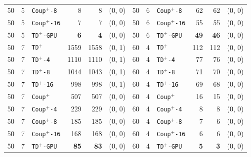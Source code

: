 \documentclass[letterpaper]{article}
\begin{document}
\begin{table}[t]
{\begin{tabular}{rrlrrl|rrlrrl}
50 & 5 & \texttt{Coup}$^+$\texttt{-8} & 8 & 8 & (0, 0) & 50 & 6 & \texttt{Coup}$^+$\texttt{-8} & 62 & 62 & (0, 0) \\
50 & 5 & \texttt{Coup}$^+$\texttt{-16} & 7 & 7 & (0, 0) & 50 & 6 & \texttt{Coup}$^+$\texttt{-16} & 55 & 55 & (0, 0) \\
50 & 5 & \texttt{TD}$^+$\texttt{-GPU} & \textbf{6} & \textbf{4} & (0, 0) & 50 & 6 & \texttt{TD}$^+$\texttt{-GPU} & \textbf{49} & \textbf{46} & (0, 0) \\
\midrule
50 & 7 & \texttt{TD}$^+$ & 1559 & 1558 & (0, 1) & 60 & 4 & \texttt{TD}$^+$ & 112 & 112 & (0, 0) \\
50 & 7 & \texttt{TD}$^+$\texttt{-4} & 1110 & 1110 & (0, 1) & 60 & 4 & \texttt{TD}$^+$\texttt{-4} & 77 & 76 & (0, 0) \\
50 & 7 & \texttt{TD}$^+$\texttt{-8} & 1044 & 1043 & (0, 1) & 60 & 4 & \texttt{TD}$^+$\texttt{-8} & 71 & 70 & (0, 0) \\
50 & 7 & \texttt{TD}$^+$\texttt{-16} & 998 & 998 & (0, 1) & 60 & 4 & \texttt{TD}$^+$\texttt{-16} & 69 & 68 & (0, 0) \\
50 & 7 & \texttt{Coup}$^+$ & 507 & 507 & (0, 0) & 60 & 4 & \texttt{Coup}$^+$ & 16 & 15 & (0, 0) \\
50 & 7 & \texttt{Coup}$^+$\texttt{-4} & 229 & 229 & (0, 0) & 60 & 4 & \texttt{Coup}$^+$\texttt{-4} & 8 & 8 & (0, 0) \\
50 & 7 & \texttt{Coup}$^+$\texttt{-8} & 185 & 185 & (0, 0) & 60 & 4 & \texttt{Coup}$^+$\texttt{-8} & 7 & 6 & (0, 0) \\
50 & 7 & \texttt{Coup}$^+$\texttt{-16} & 168 & 168 & (0, 0) & 60 & 4 & \texttt{Coup}$^+$\texttt{-16} & 6 & 6 & (0, 0) \\
50 & 7 & \texttt{TD}$^+$\texttt{-GPU} & \textbf{85} & \textbf{83} & (0, 0) & 60 & 4 & \texttt{TD}$^+$\texttt{-GPU} & \textbf{5} & \textbf{3} & (0, 0) \\
\bottomrule
\end{tabular}
}
\label{tab:mokp_result}
\end{table}
\end{document}
